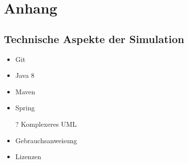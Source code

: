 \section*{Anhang}
\subsection*{Technische Aspekte der Simulation}\label{sec:ap_tec}
\begin{itemize}
	\item Git
	\item Java 8
	\item Maven
	\item Spring
	\item[?] Komplexeres UML
	\item Gebrauchsanweisung
	\item Lizenzen
\end{itemize}
